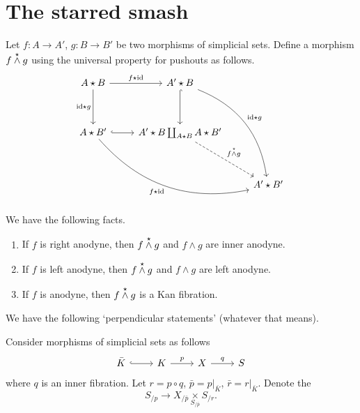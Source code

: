 \documentclass[main.tex]{subfiles}
\begin{document}
\section{The starred smash}
\label{sec:the_starred_smash}

\begin{definition}
  \label{def:starred_smash}
  Let $f\colon A \to A'$, $g\colon B \to B'$ be two morphisms of simplicial sets. Define a morphism $f \overset{\star}{\wedge} g$ using the universal property for pushouts as follows.
  \begin{equation*}
    \begin{tikzcd}[row sep=huge]
      A \star B
      \arrow[r, "f \star \id"]
      \arrow[d, swap, "\id \star g"]
      & A' \star B
      \arrow[ddr, bend left, "\id \star g"]
      \arrow[d, hookrightarrow]
      \\
      A \star B'
      \arrow[r, hookrightarrow]
      \arrow[rrd, swap, bend right, "f \star \id"]
      & A' \star B \coprod_{A \star B} A \star B'
      \arrow[dr, dashed, "f \ssmash g"]
      \\
      && A' \star B'
    \end{tikzcd}
  \end{equation*}
\end{definition}

\begin{fact}
  We have the following facts.
  \begin{enumerate}
    \item If $f$ is right anodyne, then $f \overset{\star}{\wedge} g$ and $f \wedge g$ are inner anodyne.

    \item If $f$ is left anodyne, then $f \overset{\star}{\wedge} g$ and $f \wedge g$ are left anodyne.

    \item If $f$ is anodyne, then $f \overset{\star}{\wedge} g$ is a Kan fibration.
  \end{enumerate}
\end{fact}

We have the following `perpendicular statements' (whatever that means).

\begin{fact}
  Consider morphisms of simplicial sets as follows
  \begin{equation*}
    \begin{tikzcd}
      \bar{K}
      \arrow[r, hookrightarrow]
      & K
      \arrow[r, "p"]
      & X
      \arrow[r, "q"]
      & S
    \end{tikzcd}
  \end{equation*}
  where $q$ is an inner fibration. Let $r = p \circ q$, $\bar{p} = p|_{\bar{K}}$, $\bar{r} = r|_{\bar{K}}$. Denote the
  \begin{equation*}
    S_{/p} \to X_{/\bar{p}} \underset{S_{/\bar{p}}}{\times} S_{/r}.
  \end{equation*}
\end{fact}
\end{document}
